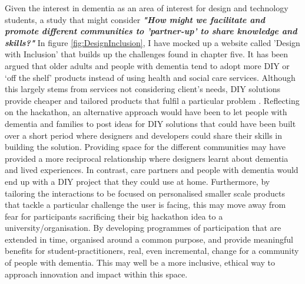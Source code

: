 Given the interest in dementia as an area of interest for design and technology students, a study that might consider \textit{\textbf{"How might we facilitate and promote different communities to 'partner-up' to share knowledge and skills?"}} In figure \ref{fig:DesignInclusion}, I have mocked up a website called 'Design with Inclusion' that builds up the challenges found in chapter five. It has been argued that older adults and people with dementia tend to adopt more DIY or ‘off the shelf’ products instead of using health and social care services. Although this largely stems from services not considering client’s needs, DIY solutions provide cheaper and tailored products that fulfil a particular problem \citep{gibson2015everyday}. Reflecting on the hackathon, an alternative approach would have been to let people with dementia and families to post ideas for DIY solutions that could have been built over a short period where designers and developers could share their skills in building the solution. Providing space for the different communities may have provided a more reciprocal relationship where designers learnt about dementia and lived experiences. In contrast, care partners and people with dementia would end up with a DIY project that they could use at home. Furthermore, by tailoring the interactions to be focused on personalised smaller scale products that tackle a particular challenge the user is facing, this may move away from fear for participants sacrificing their big hackathon idea to a university/organisation. By developing programmes of participation that are extended in time, organised around a common purpose, and provide meaningful benefits for student-practitioners, real, even incremental, change for a community of people with dementia. This may well be a more inclusive, ethical way to approach innovation and impact within this space.

